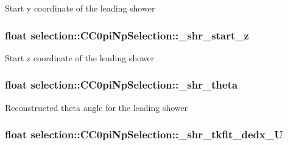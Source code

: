 Start y coordinate of the leading shower \hypertarget{classselection_1_1CC0piNpSelection_a6e8b4637c8de2991e4d48291d3e90ddf}{
\subsubsection[{\-\_\-shr\-\_\-start\-\_\-z}]{\setlength{\rightskip}{0pt plus 5cm}float selection\-::\-C\-C0pi\-Np\-Selection\-::\-\_\-shr\-\_\-start\-\_\-z\hspace{0.3cm}{\ttfamily [private]}}}\label{classselection_1_1CC0piNpSelection_a6e8b4637c8de2991e4d48291d3e90ddf}
Start z coordinate of the leading shower \hypertarget{classselection_1_1CC0piNpSelection_a624a38f7c8d33320df92e610fd0e16ee}{
\subsubsection[{\-\_\-shr\-\_\-theta}]{\setlength{\rightskip}{0pt plus 5cm}float selection\-::\-C\-C0pi\-Np\-Selection\-::\-\_\-shr\-\_\-theta\hspace{0.3cm}{\ttfamily [private]}}}\label{classselection_1_1CC0piNpSelection_a624a38f7c8d33320df92e610fd0e16ee}
Reconstructed theta angle for the leading shower \hypertarget{classselection_1_1CC0piNpSelection_aaaef69409457695e2300bf847a13804c}{
\subsubsection[{\-\_\-shr\-\_\-tkfit\-\_\-dedx\-\_\-\-U}]{\setlength{\rightskip}{0pt plus 5cm}float selection\-::\-C\-C0pi\-Np\-Selection\-::\-\_\-shr\-\_\-tkfit\-\_\-dedx\-\_\-\-U\hspace{0.3cm}{\ttfamily [private]}}}\label{classselection_1_1CC0piNpSelection_aaaef69409457695e2300bf847a13804c}
